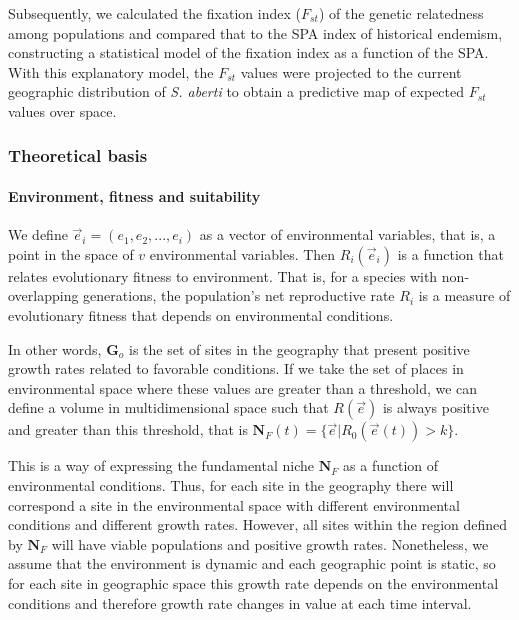 \documentclass[
]{article}
\begin{document}
Subsequently, we calculated the fixation index (\(F_{st}\)) of the
genetic relatedness among populations and compared that to the SPA index
of historical endemism, constructing a statistical model of the fixation
index as a function of the SPA. With this explanatory model, the
\(F_{st}\) values were projected to the current geographic distribution
of \textit{S. aberti} to obtain a predictive map of expected \(F_{st}\)
values over space.

\hypertarget{theoretical-basis}{%
\subsubsection{Theoretical basis}\label{theoretical-basis}}

\hypertarget{environment-fitness-and-suitability}{%
\paragraph{Environment, fitness and
suitability}\label{environment-fitness-and-suitability}}

We define \(\vec{e}_i =(e_1, e_2, ..., e_i )\) as a vector of
environmental variables, that is, a point in the space of \(v\)
environmental variables. Then \(R_i(\vec{e}_i)\) is a function that
relates evolutionary fitness to environment. That is, for a species with
non-overlapping generations, the population's net reproductive rate
\(R_i\) is a measure of evolutionary fitness that depends on
environmental conditions.

In other words, \(\mathbf{G}_o\) is the set of sites in the geography
that present positive growth rates related to favorable conditions. If
we take the set of places in environmental space where these values are
greater than a threshold, we can define a volume in multidimensional
space such that \(R(\vec{e})\) is always positive and greater than this
threshold, that is
\(\mathbf{N}_F(t) = \{\vec{e} | R_0(\vec{e}(t)) > k \}\).

This is a way of expressing the fundamental niche \(\mathbf{N}_F\) as a
function of environmental conditions. Thus, for each site in the
geography there will correspond a site in the environmental space with
different environmental conditions and different growth rates. However,
all sites within the region defined by \(\mathbf{N}_F\) will have viable
populations and positive growth rates. Nonetheless, we assume that the
environment is dynamic and each geographic point is static, so for each
site in geographic space this growth rate depends on the environmental
conditions and therefore growth rate changes in value at each time
interval.
\end{document}
